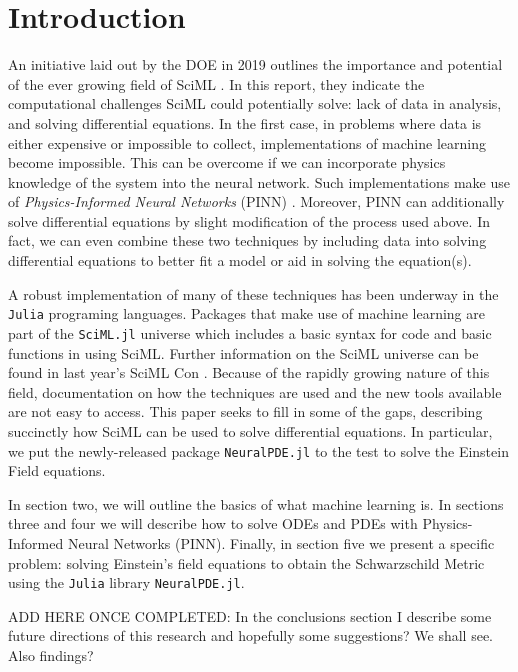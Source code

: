 \documentclass{CUP-JNL-DTM}%
\theoremstyle{definition}
\numberwithin{equation}{section}
\newcommand{\Julia}{\texttt{Julia} }
\begin{document}
\section{Introduction}

An initiative laid out by the DOE in 2019 outlines the importance and potential of the ever growing field of SciML \cite{bakerWorkshopReportBasic2019}. In this report, they indicate the computational challenges SciML could potentially solve: lack of data in analysis, and solving differential equations. In the first case, in problems where data is either expensive or impossible to collect, implementations of machine learning become impossible. This can be overcome if we can incorporate physics knowledge of the system into the neural network. Such implementations make use of \emph{Physics-Informed Neural Networks} (PINN) \cite{karniadakisPhysicsinformedMachineLearning2021}. Moreover, PINN can additionally solve differential equations by slight modification of the process used above. In fact, we can even combine these two techniques by including data into solving differential equations to better fit a model or aid in solving the equation(s). 

A robust implementation of many of these techniques has been underway in the \Julia programing languages. Packages that make use of machine learning are part of the \texttt{SciML.jl} universe which includes a basic syntax for code and basic functions in using SciML. Further information on the SciML universe can be found in last year's SciML Con \cite{SciMLCon2022}. Because of the rapidly growing nature of this field, documentation on how the techniques are used and the new tools available are not easy to access. This paper seeks to fill in some of the gaps, describing succinctly how SciML can be used to solve differential equations. In particular, we put the newly-released package \texttt{NeuralPDE.jl} to the test to solve the Einstein Field equations. 

In section two, we will outline the basics of what machine learning is. In sections three and four we will describe how to solve ODEs and PDEs with Physics-Informed Neural Networks (PINN). Finally, in section five we present a specific problem: solving Einstein's field equations to obtain the Schwarzschild Metric using the \Julia library \texttt{NeuralPDE.jl}. 

ADD HERE ONCE COMPLETED:
In the conclusions section I describe some future directions of this research and hopefully some suggestions? We shall see. Also findings?
\end{document}
